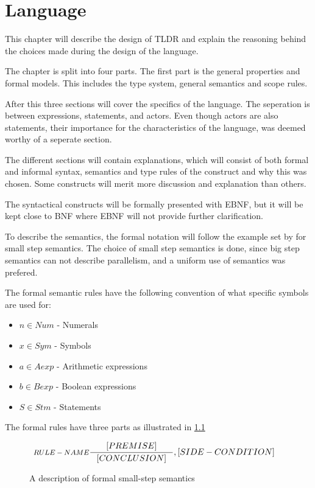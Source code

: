 \chapter{Language}\label{part:design}

This chapter will describe the design of TLDR and explain the reasoning behind the choices made during the design of the language.

The chapter is split into four parts. The first part is the general properties and formal models. This includes the type system, general semantics and scope rules.

After this three sections will cover the specifics of the language. The seperation is between expressions, statements, and actors. Even though actors are also statements, their importance for the characteristics of the language, was deemed worthy of a seperate section.

The different sections will contain explanations, which will consist of both formal and informal syntax, semantics and type rules of the construct and why this was chosen. Some constructs will merit more discussion and explanation than others.

The syntactical constructs will be formally presented with EBNF, but it will be kept close to BNF where EBNF will not provide further clarification. 

To describe the semantics, the formal notation will follow the example set by \cite{huttel2010transitions} for small step semantics. The choice of small step semantics is done, since big step semantics can not describe parallelism, and a uniform use of semantics was prefered.

The formal semantic rules have the following convention of what specific symbols are used for:
\begin{itemize}
	\item $n \in Num$ - Numerals
	\item $x \in Sym$ - Symbols
	\item $a \in Aexp$ - Arithmetic expressions
	\item $b \in Bexp$ - Boolean expressions
	\item $S \in Stm$ - Statements	
\end{itemize}

The formal rules have three parts as illustrated in \cref{SS-semantics}

\begin{figure}[H]
\begin{align*}
&\inference[$RULE-NAME$]{[PREMISE]}
                        {[CONCLUSION]}
                        {,[SIDE-CONDITION]}
\end{align*}
\caption{A description of formal small-step semantics}
\label{SS-semantics}
\end{figure}

